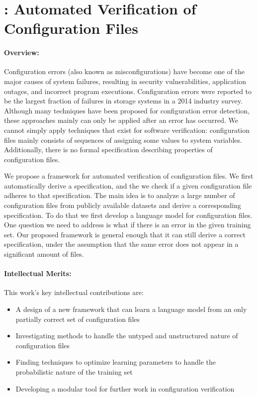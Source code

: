 \section*{\app: Automated Verification of Configuration Files}
\paragraph{Overview:} 
Configuration errors (also known as misconfigurations) have become one of the major causes of system failures, resulting in security vulnerabilities, application outages, and incorrect program executions. 
Configuration errors were reported to be the largest fraction of failures in storage systems in a 2014 industry survey. 
Although many techniques have been proposed for configuration error detection, these approaches mainly can only be applied after an error has occurred.
We cannot simply apply techniques that exist for software verification: configuration files mainly consists of sequences of assigning some values to system variables.
Additionally, there is no formal specification describing properties of configuration files.

We propose a framework for automated verification of configuration files. We first automatically derive a specification, and the we check if a given configuration 
file adheres to that specification.
The main idea is to analyze a large number of configuration files from publicly available datasets and derive a corresponding specification. To do that we first develop a language model for configuration files. One question we 
need to address is what if there is an error in the given training set. Our proposed framework 
is general enough that it can still derive a correct specification, under 
the assumption that the same error does not appear in a significant amount of files.


\paragraph{Intellectual Merits:} This work's key intellectual contributions are:
\begin{itemize}
\item A design of a new framework that can learn a language model from an only partially correct set of configuration files
\item Investigating methods to handle the untyped and unstructured nature of configuration files
\item Finding techniques to optimize learning parameters to handle the probabilistic nature of the training set
\item Developing a modular tool for further work in configuration verification
\end{itemize}

